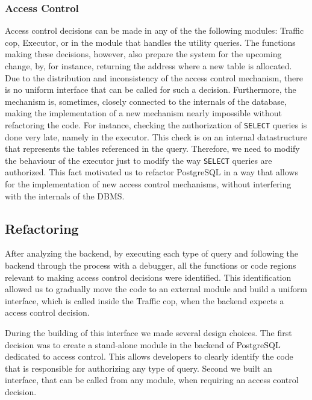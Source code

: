 \subsubsection{Access Control}
%
Access control decisions can be made in any of the the following modules: Traffic cop, Executor, or in the module that handles the utility queries.
%
The functions making these decisions, however, also prepare the system for the upcoming change, by, for instance, returning the address where a new table is allocated.
%
Due to the distribution and inconsistency of the access control mechanism, there is no uniform interface that can be called for such a decision.
%
Furthermore,  the mechanism is, sometimes, closely connected to the internals of the database, making the implementation of a new mechanism nearly impossible without refactoring the code.
%
For instance, checking the authorization of \texttt{SELECT} queries is done very late, namely in the executor.
%
This check is on an internal datastructure that represents the tables referenced in the query.
%
Therefore, we need to modify the behaviour of the executor just to modify the way \texttt{SELECT} queries are authorized.
%
This fact motivated us to refactor PostgreSQL in a way that allows for the implementation of new access control mechanisms, without interfering with the internals of the DBMS.
%
\FloatBarrier

%
\subsection{Refactoring}
%
After analyzing the backend, by executing each type of query and following the backend through the process with a debugger, all the functions or code regions relevant to making access control decisions were identified.
%
This identification allowed us to gradually move the code to an external module and build a uniform interface, which is called inside the Traffic cop, when the backend expects a access control decision. 

During the building of this interface we made several design choices.
%
The first decision was to create a stand-alone module in the backend of PostgreSQL dedicated to access control.
This allows developers to clearly identify the code that is responsible for authorizing any type of query.
%
Second we built an interface, that can be called from any module, when requiring an access control decision.

